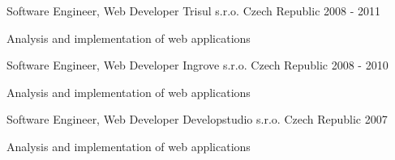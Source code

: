 \begin{cventries}
\cventry
{Software Engineer, Web Developer} %
{Trisul s.r.o.} %
{Czech Republic} %
{2008 - 2011} %
{
	\begin{cvitems} %
		\item {Analysis and implementation of web applications %
		}
	\end{cvitems}
}

\cventry
{Software Engineer, Web Developer} %
{Ingrove s.r.o.} %
{Czech Republic} %
{2008 - 2010} %
{
	\begin{cvitems} %
		\item {Analysis and implementation of web applications %
		}
	\end{cvitems}
}

\cventry
{Software Engineer, Web Developer} %
{Developstudio s.r.o.} %
{Czech Republic} %
{2007} %
{
	\begin{cvitems} %
		\item {Analysis and implementation of web applications %
		}
	\end{cvitems}
}

\end{cventries}
